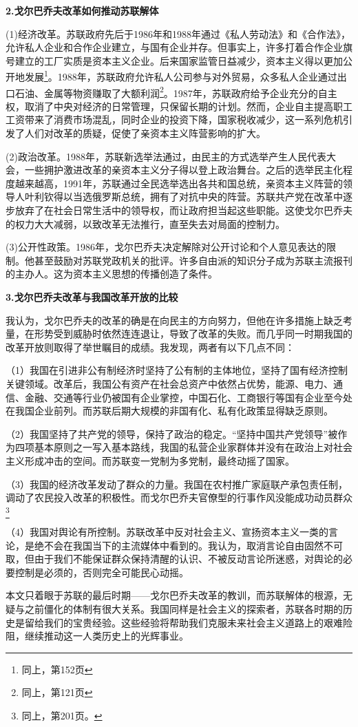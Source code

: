 \par \textbf{2.戈尔巴乔夫改革如何推动苏联解体}
\par (1)经济改革。苏联政府先后于1986年和1988年通过《私人劳动法》和《合作法》，允许私人企业和合作企业建立，与国有企业并存。但事实上，许多打着合作企业旗号建立的工厂实质是资本主义企业。后来国家监管日益减少，资本主义得以更加公开地发展\footnote{同上，第152页}。1988年，苏联政府允许私人公司参与对外贸易，众多私人企业通过出口石油、金属等物资赚取了大额利润\footnote{同上，第121页}。1987年，苏联政府给予企业充分的自主权，取消了中央对经济的日常管理，只保留长期的计划。然而，企业自主提高职工工资带来了消费市场混乱，同时企业的投资下降，国家税收减少，这一系列危机引发了人们对改革的质疑，促使了亲资本主义阵营影响的扩大。
\par (2)政治改革。1988年，苏联新选举法通过，由民主的方式选举产生人民代表大会，一些拥护激进改革的亲资本主义分子得以登上政治舞台。之后的选举民主化程度越来越高，1991年，苏联通过全民选举选出各共和国总统，亲资本主义阵营的领导人叶利钦得以当选俄罗斯总统，拥有了对抗中央的阵营。苏联共产党在改革中逐步放弃了在社会日常生活中的领导权，而让政府担当起这些职能。这使戈尔巴乔夫的权力大大减弱，以致改革无法推行，直至失去对局面的控制力。
\par (3)公开性政策。1986年，戈尔巴乔夫决定解除对公开讨论和个人意见表达的限制。他甚至鼓励对苏联党政机关的批评。许多自由派的知识分子成为苏联主流报刊的主办人。这为资本主义思想的传播创造了条件。
\par \textbf{3.戈尔巴乔夫改革与我国改革开放的比较}
\par 我认为，戈尔巴乔夫的改革的确是在向民主的方向努力，但他在许多措施上缺乏考量，在形势受到威胁时依然连连退让，导致了改革的失败。而几乎同一时期我国的改革开放则取得了举世瞩目的成绩。我发现，两者有以下几点不同：
\par （1）我国在引进非公有制经济时坚持了公有制的主体地位，坚持了国有经济控制关键领域。改革后，我国公有资产在社会总资产中依然占优势，能源、电力、通信、金融、交通等行业仍被国有企业掌控，中国石化、工商银行等国有企业至今处在我国企业前列。而苏联后期大规模的非国有化、私有化政策显得缺乏原则。
\par （2）我国坚持了共产党的领导，保持了政治的稳定。“坚持中国共产党领导”被作为四项基本原则之一写入基本路线，我国的私营企业家群体并没有在政治上对社会主义形成冲击的空间。而苏联变一党制为多党制，最终动摇了国家。 
\par （3）我国的经济改革发动了群众的力量。我国在农村推广家庭联产承包责任制，调动了农民投入改革的积极性。而戈尔巴乔夫官僚型的行事作风没能成功动员群众\footnote{同上，第201页。}
\par （4）我国对舆论有所控制。苏联改革中反对社会主义、宣扬资本主义一类的言论，是绝不会在我国当下的主流媒体中看到的。我认为，取消言论自由固然不可取，但由于我们不能保证群众保持清醒的认识、不被反动言论所迷惑，对舆论的必要控制是必须的，否则完全可能民心动摇。
\par 本文只着眼于苏联的最后时期——戈尔巴乔夫改革的教训，而苏联解体的根源，无疑与之前僵化的体制有很大关系。我国同样是社会主义的探索者，苏联各时期的历史是留给我们的宝贵经验。这些经验将帮助我们克服未来社会主义道路上的艰难险阻，继续推动这一人类历史上的光辉事业。 
\par {}

